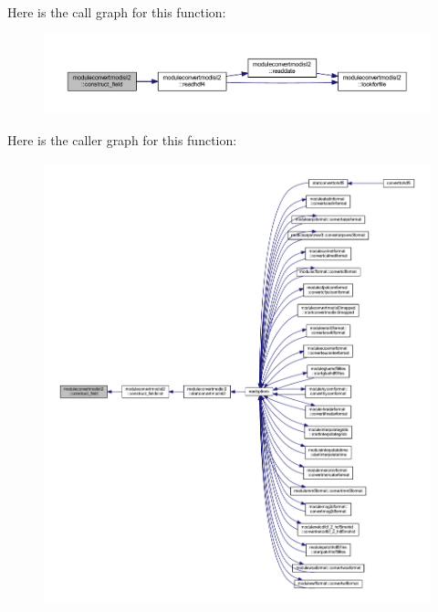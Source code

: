 Here is the call graph for this function\+:\nopagebreak
\begin{figure}[H]
\begin{center}
\leavevmode
\includegraphics[width=350pt]{namespacemoduleconvertmodisl2_a8eaadcf3a3d4a83e399eabd3c0502909_cgraph}
\end{center}
\end{figure}
Here is the caller graph for this function\+:\nopagebreak
\begin{figure}[H]
\begin{center}
\leavevmode
\includegraphics[width=350pt]{namespacemoduleconvertmodisl2_a8eaadcf3a3d4a83e399eabd3c0502909_icgraph}
\end{center}
\end{figure}
\mbox{\label{namespacemoduleconvertmodisl2_ab79be5b024d52c708202d2716a6467e7}} 
